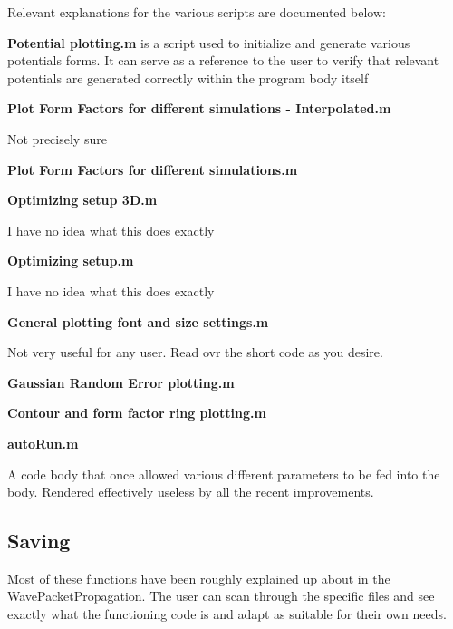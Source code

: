 \documentclass[11pt,letterpaper]{article}
\renewcommand{\\}{\bigskip}
\begin{document}
Relevant explanations for the various scripts are documented below:\\

\textbf{Potential plotting.m} is a script used to initialize and generate various potentials forms. It can serve as a reference to the user to verify that relevant potentials are generated correctly within the program body itself\\

\textbf{Plot Form Factors for different simulations - Interpolated.m}\\

Not precisely sure\\

\textbf{Plot Form Factors for different simulations.m}\\


\textbf{Optimizing setup 3D.m}\\

I have no idea what this does exactly\\

\textbf{Optimizing setup.m}\\

I have no idea what this does exactly\\

\textbf{General plotting font and size settings.m}\\

Not very useful for any user. Read ovr the short code as you desire.\\

\textbf{Gaussian Random Error plotting.m}\\


\textbf{Contour and form factor ring plotting.m}\\


\textbf{autoRun.m}\\

A code body that once allowed various different parameters to be fed into the body. Rendered effectively useless by all the recent improvements. \\

\subsection{Saving}\\

Most of these functions have been roughly explained up about in the WavePacketPropagation. The user can scan through the specific files and see exactly what the functioning code is and adapt as suitable for their own needs.\\
\end{document}
